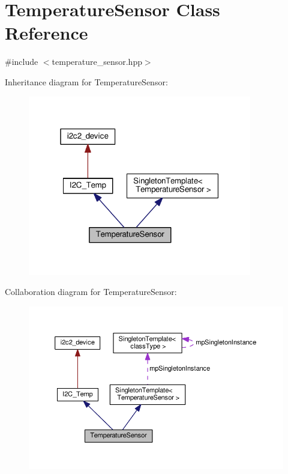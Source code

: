 \hypertarget{classTemperatureSensor}{}\section{Temperature\+Sensor Class Reference}
\label{classTemperatureSensor}


{\ttfamily \#include $<$temperature\+\_\+sensor.\+hpp$>$}



Inheritance diagram for Temperature\+Sensor\+:\nopagebreak
\begin{figure}[H]
\begin{center}
\leavevmode
\includegraphics[width=277pt]{d6/d0a/classTemperatureSensor__inherit__graph}
\end{center}
\end{figure}


Collaboration diagram for Temperature\+Sensor\+:\nopagebreak
\begin{figure}[H]
\begin{center}
\leavevmode
\includegraphics[width=350pt]{d2/d12/classTemperatureSensor__coll__graph}
\end{center}
\end{figure}
